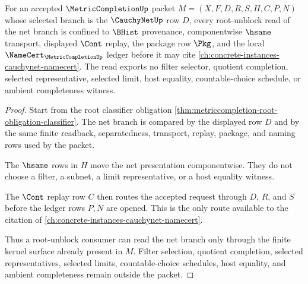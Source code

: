 \begin{theorem}
\label{thm:metriccompletion-net-scope-lock}
For an accepted $\MetricCompletionUp$ packet $M=(X,F,D,R,S,H,C,P,N)$ whose selected branch is the $\CauchyNetUp$ row $D$, every root-unblock read of the net branch is confined to $\BHist$ provenance, componentwise $\hsame$ transport, displayed $\Cont$ replay, the package row $\Pkg$, and the local $\NameCert_{\MetricCompletionUp}$ ledger before it may cite \autoref{ch:concrete-instances-cauchynet-namecert}. The read exports no filter selector, quotient completion, selected representative, selected limit, host equality, countable-choice schedule, or ambient completeness witness.
\end{theorem}
\begin{proof}
Start from the root classifier obligation \autoref{thm:metriccompletion-root-obligation-classifier}. The net branch is compared by the displayed row $D$ and by the same finite readback, separatedness, transport, replay, package, and naming rows used by the packet.

The $\hsame$ rows in $H$ move the net presentation componentwise. They do not choose a filter, a subnet, a limit representative, or a host equality witness.

The $\Cont$ replay row $C$ then routes the accepted request through $D$, $R$, and $S$ before the ledger rows $P,N$ are opened. This is the only route available to the citation of \autoref{ch:concrete-instances-cauchynet-namecert}.

Thus a root-unblock consumer can read the net branch only through the finite kernel surface already present in $M$. Filter selection, quotient completion, selected representatives, selected limits, countable-choice schedules, host equality, and ambient completeness remain outside the packet.
\end{proof}

